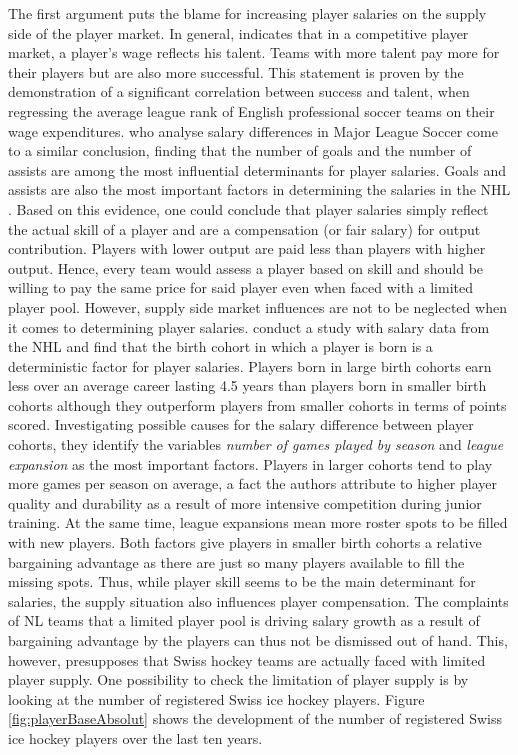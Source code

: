 \documentclass[12pt, a4paper]{article}
\begin{document}
\noindent
The first argument puts the blame for increasing player salaries on the supply side of the player market. In general, \citet{szymanski_market_2000} indicates that in a competitive player market, a player's wage reflects his talent. Teams with more talent pay more for their players but are also more successful. This statement is proven by the demonstration of a significant correlation between success and talent, when regressing the average league rank of English professional soccer teams on their wage expenditures. \citet{celik_salary_2017} who analyse salary differences in Major League Soccer come to a similar conclusion, finding that the number of goals and the number of assists are among the most influential determinants for player salaries. Goals and assists are also the most important factors in determining the salaries in the NHL \citep{coates_returns_2017}. Based on this evidence, one could conclude that player salaries simply reflect the actual skill of a player and are a compensation (or fair salary) for output contribution. Players with lower output are paid less than players with higher output. Hence, every team would assess a player based on skill and should be willing to pay the same price for said player even when faced with a limited player pool. However, supply side market influences are not to be neglected when it comes to determining player salaries. \citet{bryson_all-star_2017} conduct a study with salary data from the NHL and find that the birth cohort in which a player is born is a deterministic factor for player salaries. Players born in large birth cohorts earn less over an average career lasting 4.5 years than players born in smaller birth cohorts although they outperform players from smaller cohorts in terms of points scored. Investigating possible causes for the salary difference between player cohorts, they identify the variables \emph{number of games played by season} and \emph{league expansion} as the most important factors. Players in larger cohorts tend to play more games per season on average, a fact the authors attribute to higher player quality and durability as a result of more intensive competition during junior training. At the same time, league expansions mean more roster spots to be filled with new players. Both factors give players in smaller birth cohorts a relative bargaining advantage as there are just so many players available to fill the missing spots. Thus, while player skill seems to be the main determinant for salaries, the supply situation also influences player compensation. The complaints of NL teams that a limited player pool is driving salary growth as a result of bargaining advantage by the players can thus not be dismissed out of hand. This, however, presupposes that Swiss hockey teams are actually faced with limited player supply. One possibility to check the limitation of player supply is by looking at the number of registered Swiss ice hockey players. Figure \ref{fig:playerBaseAbsolut} shows the development of the number of registered Swiss ice hockey players over the last ten years. 
\end{document}
